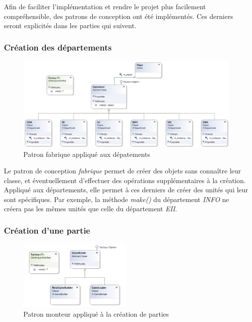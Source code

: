 Afin de faciliter l'implémentation et rendre le projet plus facilement compréhensible, des patrons de conception ont été implémentés.
Ces derniers seront explicités dans les parties qui suivent.

\subsubsection{Création des départements} %

\begin{figure}[!h]
\centering
\includegraphics[width=\textwidth]{Parties/Images/UML_Dept.png}
\caption{Patron fabrique appliqué aux dépatements}
\label{fig:uml_dept}
\end{figure}

Le patron de conception \emph{fabrique} permet de créer des objets sans connaître leur classe, et éventuellement d'effectuer des opérations supplémentaires à la création.
Appliqué aux départements, elle permet à ces derniers de créer des unités qui leur sont spécifiques.
Par exemple, la méthode \emph{make()} du département \emph{INFO} ne créera pas les mêmes unités que celle du département \emph{EII}.

\subsubsection{Création d'une partie} %

\begin{figure}[!h]
\centering
\includegraphics[width=0.5\textwidth]{Parties/Images/UML_Game.png}
\caption{Patron monteur appliqué à la création de parties}
\label{fig:uml_game}
\end{figure}

